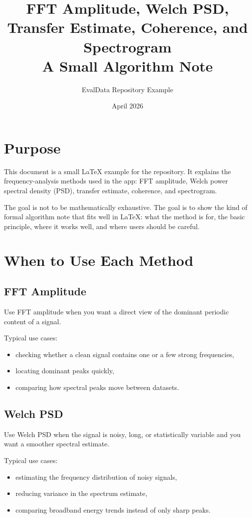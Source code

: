 \documentclass[11pt,a4paper]{article}
\title{FFT Amplitude, Welch PSD, Transfer Estimate, Coherence, and Spectrogram\\A Small Algorithm Note}
\author{EvalData Repository Example}
\date{April 2026}
\begin{document}
\maketitle

\section{Purpose}

This document is a small LaTeX example for the repository. It explains the frequency-analysis methods used in the app: FFT amplitude, Welch power spectral density (PSD), transfer estimate, coherence, and spectrogram.

The goal is not to be mathematically exhaustive. The goal is to show the kind of formal algorithm note that fits well in LaTeX: what the method is for, the basic principle, where it works well, and where users should be careful.

\section{When to Use Each Method}

\subsection{FFT Amplitude}

Use FFT amplitude when you want a direct view of the dominant periodic content of a signal.

Typical use cases:

\begin{itemize}
    \item checking whether a clean signal contains one or a few strong frequencies,
    \item locating dominant peaks quickly,
    \item comparing how spectral peaks move between datasets.
\end{itemize}

\subsection{Welch PSD}

Use Welch PSD when the signal is noisy, long, or statistically variable and you want a smoother spectral estimate.

Typical use cases:

\begin{itemize}
    \item estimating the frequency distribution of noisy signals,
    \item reducing variance in the spectrum estimate,
    \item comparing broadband energy trends instead of only sharp peaks.
\end{itemize}
\end{document}
